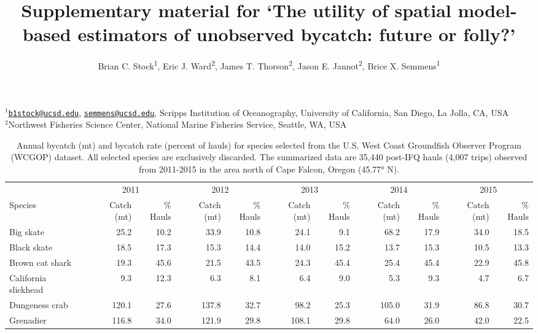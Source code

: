 \documentclass[]{article}
\title{Supplementary material for `The utility of spatial model-based
estimators of unobserved bycatch: future or folly?'}
\author{Brian C. Stock\textsuperscript{1}, Eric J. Ward\textsuperscript{2},
James T. Thorson\textsuperscript{2}, Jason E. Jannot\textsuperscript{2},
Brice X. Semmens\textsuperscript{1}}
\date{}
\begin{document}
\maketitle

\(^1\)\href{mailto:b1stock@ucsd.edu}{\nolinkurl{b1stock@ucsd.edu}},
\href{mailto:semmens@ucsd.edu}{\nolinkurl{semmens@ucsd.edu}}, Scripps
Institution of Oceanography, University of California, San Diego, La
Jolla, CA, USA\\
\(^2\)Northwest Fisheries Science Center, National Marine Fisheries
Service, Seattle, WA, USA

\listoftables
\listoffigures

\pagebreak

\begin{table}[!h]

\caption[Annual bycatch (mt) and bycatch rate (percent of hauls) for species selected from the U.S. WCGOP dataset.]{\label{tab:species-list-byyear}\label{tab:species-list-byyear}Annual bycatch (mt) and bycatch rate (percent of hauls) for species selected from the U.S. West Coast Groundfish Observer Program (WCGOP) dataset. All selected species are exclusively discarded. The summarized data are 35,440 post-IFQ hauls (4,007 trips) observed from 2011-2015 in the area north of Cape Falcon, Oregon (45.77° N).}
\centering
\begin{tabular}{lrrrrrrrrrr}
\toprule
\multicolumn{1}{c}{ } & \multicolumn{2}{c}{2011} & \multicolumn{2}{c}{2012} & \multicolumn{2}{c}{2013} & \multicolumn{2}{c}{2014} & \multicolumn{2}{c}{2015} \\
\cmidrule(l{2pt}r{2pt}){2-3} \cmidrule(l{2pt}r{2pt}){4-5} \cmidrule(l{2pt}r{2pt}){6-7} \cmidrule(l{2pt}r{2pt}){8-9} \cmidrule(l{2pt}r{2pt}){10-11}
Species & Catch (mt) & \% Hauls & Catch (mt) & \% Hauls & Catch (mt) & \% Hauls & Catch (mt) & \% Hauls & Catch (mt) & \% Hauls\\
\midrule
Big skate & 25.2 & 10.2 & 33.9 & 10.8 & 24.1 & 9.1 & 68.2 & 17.9 & 34.0 & 18.5\\
Black skate & 18.5 & 17.3 & 15.3 & 14.4 & 14.0 & 15.2 & 13.7 & 15.3 & 10.5 & 13.3\\
Brown cat shark & 19.3 & 45.6 & 21.5 & 43.5 & 24.3 & 45.4 & 25.4 & 45.4 & 22.9 & 45.8\\
California slickhead & 9.3 & 12.3 & 6.3 & 8.1 & 6.4 & 9.0 & 5.3 & 9.3 & 4.7 & 6.7\\
Dungeness crab & 120.1 & 27.6 & 137.8 & 32.7 & 98.2 & 25.3 & 105.0 & 31.9 & 86.8 & 30.7\\
\addlinespace
Grenadier & 116.8 & 34.0 & 121.9 & 29.8 & 108.1 & 29.8 & 64.0 & 26.0 & 42.0 & 22.5\\

\end{tabular}
\end{table}
\end{document}
